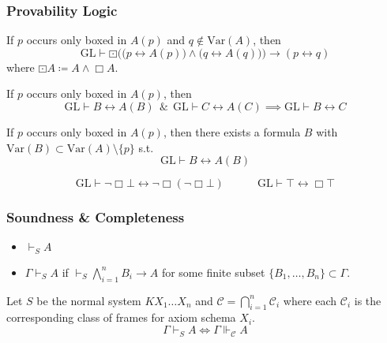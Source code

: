 \documentclass[UTF8,aspectratio=43,11pt,colorlinks,compress,openany]{beamer}%
\begin{document}
\begin{frame}\frametitle{Provability Logic}
\setlength\abovedisplayskip{0pt}
\setlength\belowdisplayskip{0pt}\vspace{-1ex}
	\begin{theorem}
		If $p$ occurs only boxed in $A(p)$ and $q\notin \mathrm{Var}(A)$, then
		\[\mathrm{GL}\vdash\boxdot\Big(\big(p\leftrightarrow A(p)\big)\wedge\big(q\leftrightarrow A(q)\big)\Big)\to(p\leftrightarrow q)\]
		where $\boxdot A\coloneqq  A\wedge\Box A$.
	\end{theorem}\vspace{-1ex}
	\begin{corollary}
		If $p$ occurs only boxed in $A(p)$, then \[\mathrm{GL}\vdash B\leftrightarrow A(B)\;\,\&\;\,\mathrm{GL}\vdash C\leftrightarrow A(C)\implies\mathrm{GL}\vdash B\leftrightarrow C\]
	\end{corollary}\vspace{-1ex}
	\begin{theorem}
		If $p$ occurs only boxed in $A(p)$, then there exists a formula $B$ with $\mathrm{Var}(B)\subset \mathrm{Var}(A)\setminus\{p\}$ s.t.
		\[\mathrm{GL}\vdash B\leftrightarrow A(B)\]	
	\end{theorem}
	\begin{center}
	\end{center}
	\[\mathrm{GL}\vdash\neg\Box\bot\leftrightarrow\neg\Box(\neg\Box\bot)\qquad\quad\mathrm{GL}\vdash\top\leftrightarrow\Box\top\]
\end{frame}

\begin{frame}\frametitle{Soundness \& Completeness}
	\begin{definition}
		\begin{itemize}
			\item $\vdash_S A$
			\item $\Gamma\vdash_S A$ if $\vdash_S\bigwedge\limits_{i=1}^n B_i\to A$ for some finite subset $\{B_1,\dots, B_n\}\subset\Gamma$.
		\end{itemize}
	\end{definition}
	\begin{theorem}
		Let $S$ be the normal system $KX_1\dots X_n$ and $\mathcal{C}=\bigcap\limits_{i=1}^n\mathcal{C}_i$ where each $\mathcal{C}_i$ is the corresponding class of frames for axiom schema $X_i$.
		\[\Gamma\vdash_S A\iff\Gamma\Vdash_{\mathcal{C}} A\]
	\end{theorem}
\end{frame}
\end{document}
